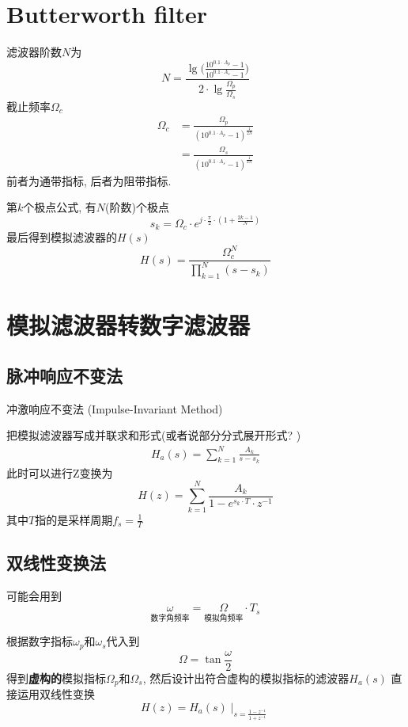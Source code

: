 \documentclass[a4paper]{report}
\begin{document}
\section{Butterworth filter}
滤波器阶数$N$为
\begin{equation}
  N=\frac{\lg{\bigg(\frac{10^{0.1\cdot A_p}-1}{10^{0.1\cdot A_s}-1}\bigg)}}{2\cdot\lg{\frac{\Omega_p}{\Omega_s}}}
\end{equation}
截止频率$\Omega_c$
\begin{align}
  \Omega_c&=\frac{\Omega_p}{(10^{0.1\cdot A_p}-1)^{\frac{1}{2N}}}
  \\ &=\frac{\Omega_s}{(10^{0.1\cdot A_s}-1)^{\frac{1}{2N}}}
\end{align}
前者为通带指标, 后者为阻带指标. 

第$k$个极点公式, 有$N$(阶数)个极点
\begin{equation}
  s_k=\Omega_c\cdot e^{j\cdot\frac{\pi}{2}\cdot (1+\frac{2k-1}{N})}
\end{equation}
最后得到模拟滤波器的$H(s)$
\begin{equation}
  H(s)=\frac{\Omega_c^N}{\displaystyle\prod_{k=1}^{N}(s-s_k)}
\end{equation}
\section{模拟滤波器转数字滤波器}
\subsection{脉冲响应不变法}
冲激响应不变法 (Impulse-Invariant Method)

把模拟滤波器写成并联求和形式(或者说部分分式展开形式? )
\begin{align}
  H_a(s)=\displaystyle\sum_{k=1}^{N}\frac{A_k}{s-s_k}
\end{align}
此时可以进行Z变换为
\begin{equation}
  H(z)=\displaystyle\sum_{k=1}^{N}\frac{A_k}{1-e^{s_k\cdot T}\cdot z^{-1}}
\end{equation}
其中$T$指的是采样周期$f_s=\frac{1}{T}$
\subsection{双线性变换法}
可能会用到
\begin{equation}
  \underset{\text{数字角频率}}{\omega}=\underset{\text{模拟角频率}}{\Omega}\cdot T_s
\end{equation}

根据数字指标$\omega_p$和$\omega_s$代入到
\begin{equation}
  \Omega=\tan{\frac{\omega}{2}}
\end{equation}
得到\textbf{虚构的}模拟指标$\Omega_p$和$\Omega_s$, 然后设计出符合虚构的模拟指标的滤波器$H_a(s)$
直接运用双线性变换
\begin{equation}
  H(z)=H_a(s)\mid_{s=\frac{1-z^{-1}}{1+z^{-1}}}
\end{equation}
\end{document}
